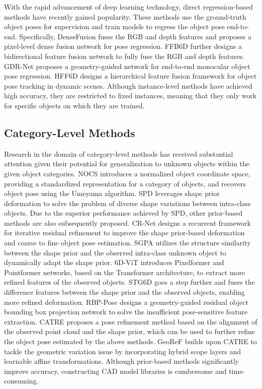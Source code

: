 \par With the rapid advancement of deep learning technology, direct regression-based methods\cite{13,14,15,16,17} have recently gained popularity. These methods use the ground-truth object poses for supervision and train models to regress the object pose end-to-end. Specifically, DenseFusion\cite{13} fuses the RGB and depth features and proposes a pixel-level dense fusion network for pose regression. FFB6D\cite{14} further designs a bidirectional feature fusion network to fully fuse the RGB and depth features. GDR-Net\cite{15} proposes a geometry-guided network for end-to-end monocular object pose regression. HFF6D\cite{16} designs a hierarchical feature fusion framework for object pose tracking in dynamic scenes. Although instance-level methods have achieved high accuracy, they are restricted to fixed instances, meaning that they only work for specific objects on which they are trained.

\vspace{-1em}
\subsection{Category-Level Methods}
Research in the domain of category-level methods has received substantial attention given their potential for generalization to unknown objects within the given object categories. 
NOCS\cite{18} introduces a normalized object coordinate space, providing a standardized representation for a category of objects, and recovers object pose using the Umeyama algorithm. SPD\cite{19} leverages shape prior deformation to solve the problem of diverse shape variations between intra-class objects. Due to the superior performance achieved by SPD, other prior-based methods are also subsequently proposed. CR-Net\cite{20} designs a recurrent framework for iterative residual refinement to improve the shape prior-based deformation and coarse to fine object pose estimation. SGPA\cite{21} utilizes the structure similarity between the shape prior and the observed intra-class unknown object to dynamically adapt the shape prior. 6D-ViT\cite{22} introduces Pixelformer and Pointformer networks, based on the Transformer architecture, to extract more refined features of the observed objects. STG6D\cite{23} goes a step further and fuses the difference features between the shape prior and the observed objects, enabling more refined deformation. RBP-Pose\cite{24} designs a geometry-guided residual object bounding box projection network to solve the insufficient pose-sensitive feature extraction.
CATRE\cite{26} proposes a pose refinement method based on the alignment of the observed point cloud and the shape prior, which can be used to further refine the object pose estimated by the above methods. GeoReF \cite{25} builds upon CATRE \cite{26} to tackle the geometric variation issue by incorporating hybrid scope layers and learnable affine transformations. Although prior-based methods significantly improve accuracy, constructing CAD model libraries is cumbersome and time-consuming. 

